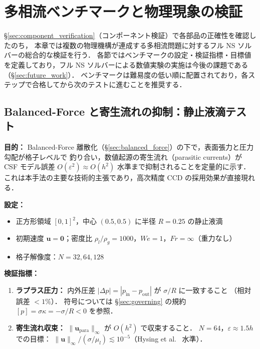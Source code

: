 %
%

\section{多相流ベンチマークと物理現象の検証}
\label{sec:validation}
\label{sec:benchmarks}

§\ref{sec:component_verification}（コンポーネント検証）で各部品の正確性を確認したのち，
本章では複数の物理機構が連成する多相流問題に対するフル NS ソルバーの総合的な検証を行う．
各節ではベンチマークの設定・検証指標・目標値を定義しており，フル NS ソルバーによる数値実験の実施は今後の課題である（§\ref{sec:future_work}）．
ベンチマークは難易度の低い順に配置されており，各ステップで合格してから次のテストに進むことを推奨する．

\subsection{Balanced-Force と寄生流れの抑制：静止液滴テスト}
\label{sec:val_static_drop}
\label{sec:bench_droplet}

\textbf{目的：}
Balanced-Force 離散化（§\ref{sec:balanced_force}）の下で，表面張力と圧力勾配が格子レベルで
釣り合い，数値起源の寄生流れ（parasitic currents）が CSF モデル誤差 $O(\varepsilon^2) \approx O(h^2)$
水準まで抑制されることを定量的に示す．
これは本手法の主要な技術的主張であり，高次精度 CCD の採用効果が直接現れる．

\textbf{設定：}
\begin{itemize}
  \item 正方形領域 $[0,1]^2$，中心 $(0.5, 0.5)$ に半径 $R=0.25$ の静止液滴
  \item 初期速度 $\bm{u} = \bm{0}$；密度比 $\rho_l/\rho_g = 1000$，$We = 1$，$Fr = \infty$（重力なし）
  \item 格子解像度：$N = 32, 64, 128$
\end{itemize}

\textbf{検証指標：}
\begin{enumerate}
  \item \textbf{ラプラス圧力：}
        内外圧差 $|\Delta p| = |p_{\mathrm{in}} - p_{\mathrm{out}}|$ が $\sigma / R$ に一致すること
        （相対誤差 $< 1\%$）．
        符号については §\ref{sec:governing} の規約 $[p] = \sigma\kappa = -\sigma/R < 0$ を参照．
  \item \textbf{寄生流れ収束：}
        $\|\bm{u}_{\mathrm{para}}\|_\infty$ が $O(h^2)$ で収束すること．
        $N = 64$，$\varepsilon \approx 1.5h$ での目標：
        $\|\bm{u}\|_\infty / (\sigma/\mu_l) \lesssim 10^{-5}$（Hysing et al.~\cite{Hysing2009} 水準）．
\end{enumerate}

